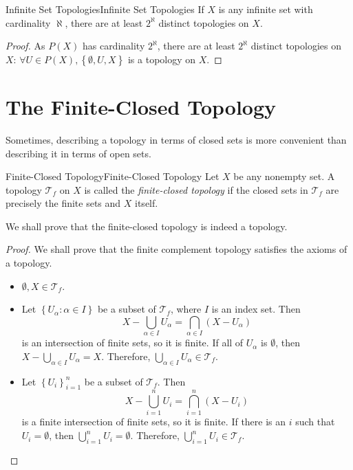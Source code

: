 \documentclass[../main.tex]{subfiles}
\begin{document}
\begin{proposition}{Infinite Set Topologies}{Infinite Set Topologies}
	If $X$ is any infinite set with cardinality $\aleph$, there are at least $2^{\aleph}$ distinct topologies on $X$.
\end{proposition}
\begin{proof}
	As $P(X)$ has cardinality $2^{\aleph}$, there are at least $2^{\aleph}$ distinct topologies on $X$: $\forall U\in P(X), \left\{ \emptyset ,U,X \right\}$ is a topology on $X$.
\end{proof}


\section{The Finite-Closed Topology}

Sometimes, describing a topology in terms of closed sets is more convenient than describing it in terms of open sets.
\begin{definition}{Finite-Closed Topology}{Finite-Closed Topology}
	Let $X$ be any nonempty set. A topology $\mathcal{T}_f$ on $X$ is called the \emph{finite-closed topology} if the closed sets in $\mathcal{T}_f$ are precisely the finite sets and $X$ itself.
\end{definition}

We shall prove that the finite-closed topology is indeed a topology.
\begin{proof}
We shall prove that the finite complement topology satisfies the axioms of a topology.
\begin{itemize}
	\item $\emptyset, X \in \mathcal{T}_f$.
	\item Let $\left\{ U_{\alpha}: \alpha\in I \right\}$ be a subset of $\mathcal{T}_f$, where $I$ is an index set. Then
	\begin{equation*}
		X - \bigcup_{\alpha \in I} U_{\alpha} = \bigcap_{\alpha \in I} (X - U_{\alpha})
	\end{equation*}
	is an intersection of finite sets, so it is finite. If all of $U_{\alpha}$ is $\emptyset $, then $X - \bigcup_{\alpha \in I} U_{\alpha} = X$. Therefore, $\bigcup_{\alpha \in I} U_{\alpha} \in \mathcal{T}_f$.
	\item Let $\left\{ U_i \right\}_{i=1}^n$ be a subset of $\mathcal{T}_f$. Then 
	\begin{equation*}
		X - \bigcup_{i=1}^n U_i = \bigcap_{i=1}^n (X - U_i)
	\end{equation*}
	is a finite intersection of finite sets, so it is finite. If there is an $i$ such that $U_i = \emptyset$, then $\bigcup_{i=1}^n U_i = \emptyset$. Therefore, $\bigcup_{i=1}^n U_i \in \mathcal{T}_f$.
\end{itemize}
\end{proof}
\end{document}
